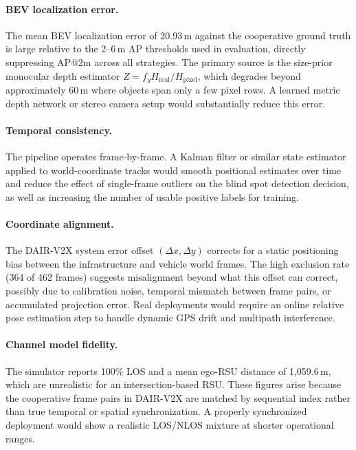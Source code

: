\documentclass[12pt]{article}
\begin{document}
\paragraph{BEV localization error.}
The mean BEV localization error of 20.93\,m against the cooperative ground truth is large relative to the 2--6\,m AP thresholds used in evaluation, directly suppressing AP@2m across all strategies. The primary source is the size-prior monocular depth estimator $Z = f_y H_{\text{real}} / H_{\text{pixel}}$, which degrades beyond approximately 60\,m where objects span only a few pixel rows. A learned metric depth network or stereo camera setup would substantially reduce this error.

\paragraph{Temporal consistency.}
The pipeline operates frame-by-frame. A Kalman filter or similar state estimator applied to world-coordinate tracks would smooth positional estimates over time and reduce the effect of single-frame outliers on the blind spot detection decision, as well as increasing the number of usable positive labels for training.

\paragraph{Coordinate alignment.}
The DAIR-V2X system error offset $(\Delta x, \Delta y)$ corrects for a static positioning bias between the infrastructure and vehicle world frames. The high exclusion rate (364 of 462 frames) suggests misalignment beyond what this offset can correct, possibly due to calibration noise, temporal mismatch between frame pairs, or accumulated projection error. Real deployments would require an online relative pose estimation step to handle dynamic GPS drift and multipath interference.

\paragraph{Channel model fidelity.}
The simulator reports 100\% LOS and a mean ego-RSU distance of 1{,}059.6\,m, which are unrealistic for an intersection-based RSU. These figures arise because the cooperative frame pairs in DAIR-V2X are matched by sequential index rather than true temporal or spatial synchronization. A properly synchronized deployment would show a realistic LOS/NLOS mixture at shorter operational ranges.
\end{document}
